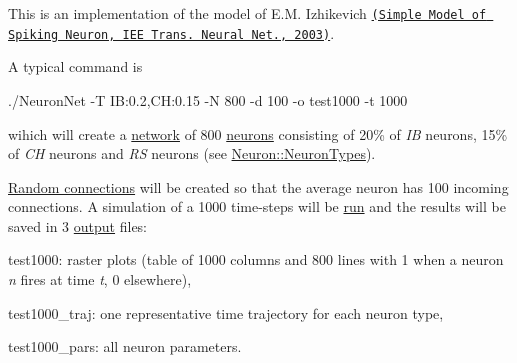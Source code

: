 This is an implementation of the model of E.\+M. Izhikevich \href{https://www.izhikevich.org/publications/spikes.pdf}{\tt (Simple Model of Spiking Neuron, I\+EE Trans. Neural Net., 2003)}.

A typical command is \begin{DoxyVerb}./NeuronNet -T IB:0.2,CH:0.15 -N 800 -d 100 -o test1000 -t 1000\end{DoxyVerb}
 wihich will create a \hyperlink{classNetwork}{network} of 800 \hyperlink{classNeuron}{neurons} consisting of 20\% of {\itshape IB} neurons, 15\% of {\itshape CH} neurons and {\itshape RS} neurons (see \hyperlink{classNeuron_ab4b47274e756b72923d2f8a9a5037d23}{Neuron\+::\+Neuron\+Types}).

\hyperlink{classNetwork_a681d8f731ce258376a20f9bf062b943b}{Random connections} will be created so that the average neuron has 100 incoming connections. A simulation of a 1000 time-\/steps will be \hyperlink{classSimulation_ae5c367f87c0b5dc9740bc6d00e44e72c}{run} and the results will be saved in 3 \hyperlink{classSimulation_a9ad4c807c6ddf9066041f764f0ccb9dc}{output} files\+:
\begin{DoxyItemize}
\item test1000\+: raster plots (table of 1000 columns and 800 lines with 1 when a neuron {\itshape n} fires at time {\itshape t}, 0 elsewhere),
\item test1000\+\_\+traj\+: one representative time trajectory for each neuron type,
\item test1000\+\_\+pars\+: all neuron parameters. 
\end{DoxyItemize}